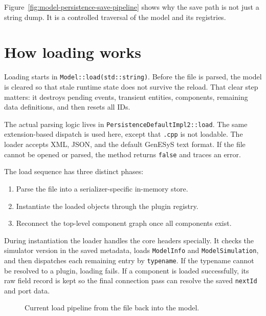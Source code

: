 Figure~\ref{fig:model-persistence-save-pipeline} shows why the save path is
not just a string dump. It is a controlled traversal of the model and its
registries.

\section{How loading works}
\label{sec:model-persistence-loading}

Loading starts in \texttt{Model::load(std::string)}. Before the file is parsed,
the model is cleared so that stale runtime state does not survive the reload.
That clear step matters: it destroys pending events, transient entities,
components, remaining data definitions, and then resets all IDs.

The actual parsing logic lives in \texttt{PersistenceDefaultImpl2::load}. The
same extension-based dispatch is used here, except that \texttt{.cpp} is not
loadable. The loader accepts XML, JSON, and the default GenESyS text format.
If the file cannot be opened or parsed, the method returns \texttt{false} and
traces an error.

The load sequence has three distinct phases:
\begin{enumerate}
\item Parse the file into a serializer-specific in-memory store.
\item Instantiate the loaded objects through the plugin registry.
\item Reconnect the top-level component graph once all components exist.
\end{enumerate}

During instantiation the loader handles the core headers specially. It checks
the simulator version in the saved metadata, loads \texttt{ModelInfo} and
\texttt{ModelSimulation}, and then dispatches each remaining entry by
\texttt{typename}. If the typename cannot be resolved to a plugin, loading
fails. If a component is loaded successfully, its raw field record is kept so
the final connection pass can resolve the saved \texttt{nextId} and port data.

\begin{figure}[htbp]
\centering
\caption{Current load pipeline from the file back into the model.}
\label{fig:model-persistence-load-pipeline}
\end{figure}

